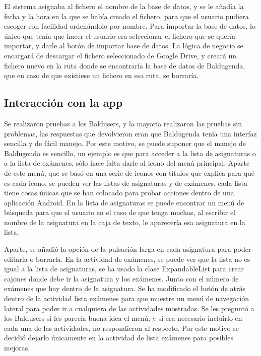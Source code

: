 El sistema asignaba al fichero el nombre de la base de datos, y se le añadía la fecha y la hora en la que se había creado el fichero, para que el usuario pudiera escoger con facilidad ordenándolo por nombre.
Para importar la base de datos, lo único que tenía que hacer el usuario era seleccionar el fichero que se quería importar, y darle al botón de importar base de datos.
La lógica de negocio se encargará de descargar el fichero seleccionado de Google Drive, y creará un fichero nuevo en la ruta donde se encontraría la base de datos de Baldugenda, que en caso de que existiese un fichero en esa ruta, se borraría.

\subsection{Interacción con la app}
\label{subsecc:Interacción con la app}

Se realizaron pruebas a los Baldusers, y la mayoria realizaron las pruebas sin problemas, las respuestas que devolvieron eran que Baldugenda tenía una interfaz sencilla y de fácil manejo. Por este motivo, se puede suponer que el manejo de Baldugenda es sencillo, un ejemplo es que para acceder a la lista de asignaturas o a la lista de exámenes, sólo hace falta darle al icono del menú principal.
Aparte de este menú, que se basó en una serie de iconos con títulos que explica para qué es cada icono, se pueden ver las listas de asignaturas y de exámenes, cada lista tiene cosas únicas que se han colocado para probar acciones dentro de una aplicación Android.
En la lista de asignaturas se puede encontrar un menú de búsqueda para que el usuario en el caso de que tenga muchas, al escribir el nombre de la asignatura en la caja de texto, le aparecería esa asignatura en la lista.

Aparte, se añadió la opción de la pulsación larga en cada asignatura para poder editarla o borrarla.
En la actividad de exámenes, se puede ver que la lista no es igual a la lista de asignaturas, se ha usado la clase ExpandableList para crear cajones donde debe ir la asignatura y los exámenes. Junto con el número de exámenes que hay dentro de la asignatura.
Se ha modificado el botón de atrás dentro de la actividad lista exámenes para que muestre un menú de navegación lateral para poder ir a cualquiera de las actividades mostradas. Se les preguntó a los Baldusers si les parecía buena idea el menú, y si era necesario incluirlo en cada una de las actividades, no respondieron al respecto. Por este motivo se decidió dejarlo únicamente en la actividad de lista exámenes para posibles mejoras.
